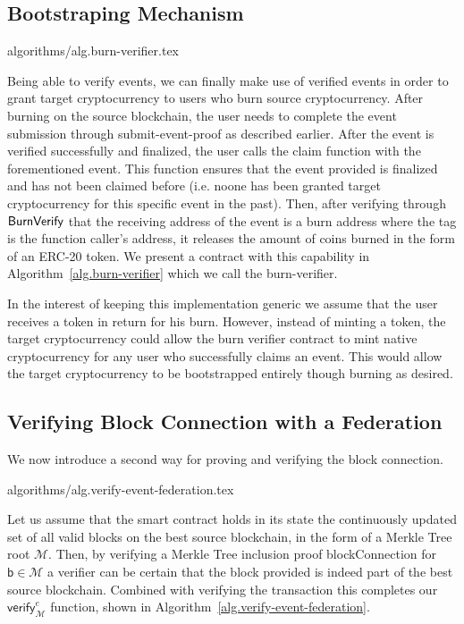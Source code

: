 \subsection{Bootstraping Mechanism}
{algorithms/alg.burn-verifier.tex}

Being able to verify events, we can finally make use of verified events in order to grant target cryptocurrency to users who burn source cryptocurrency. After burning on the source blockchain, the user needs to complete the event submission through \textsf{submit-event-proof} as described earlier. After the event is verified successfully and finalized, the user calls the \textsf{claim} function with the forementioned event. This function ensures that the event provided is finalized and has not been claimed before (i.e. noone has been granted target cryptocurrency for this specific event in the past). Then, after verifying through $\mathsf{BurnVerify}$ that the receiving address of the event is a burn address where the tag is the function caller's address, it releases the amount of coins burned in the form of an ERC-20 token. We present a contract with this capability in Algorithm~\ref{alg.burn-verifier} which we call the \textsf{burn-verifier}.

In the interest of keeping this implementation generic we assume that the user receives a token in return for his burn. However, instead of minting a token, the target cryptocurrency could allow the burn verifier contract to mint native cryptocurrency for any user who successfully claims an event. This would allow the target cryptocurrency to be bootstrapped entirely though burning as desired.

\subsection{Verifying Block Connection with a Federation}
We now introduce a second way for proving and verifying the block connection.

{algorithms/alg.verify-event-federation.tex}

Let us assume that the smart contract holds in its state the continuously updated set of all valid blocks on the best source blockchain, in the form of a Merkle Tree root $\mathcal{M}$. Then, by verifying a Merkle Tree inclusion proof \textsf{blockConnection} for $\textsf{b} \in \mathcal{M}$ a verifier can be certain that the block provided is indeed part of the best source blockchain. Combined with verifying the transaction this completes our $\textsf{verify}_\mathcal{M}^e$ function, shown in Algorithm~\ref{alg.verify-event-federation}.

